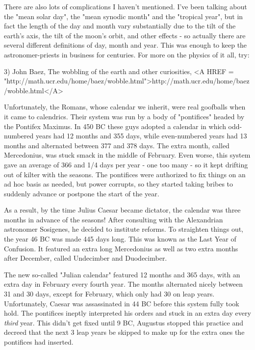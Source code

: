 There are also lots of complications I haven't mentioned.   I've been
talking about the "mean solar day", the "mean synodic month" and the
"tropical year", but in fact the length of the day and month vary
substantially due to the tilt of the earth's axis, the tilt of the
moon's orbit, and other effects - so actually there are several
different definitions of day, month and year.  This was enough to keep
the astronomer-priests in business for centuries.  For more on the
physics of it all, try:

3) John Baez, The wobbling of the earth and other curiosities,
<A HREF = "http://math.ucr.edu/home/baez/wobble.html">http://math.ucr.edu/home/baez/wobble.html</A>

Unfortunately, the Romans, whose calendar we inherit, were real
goofballs when it came to calendrics.  Their system was run by a body of
"pontifices" headed by the Pontifex Maximus.  In 450 BC these guys
adopted a calendar in which odd-numbered years had 12 months and 355
days, while even-numbered years had 13 months and alternated between 377
and 378 days.  The extra month, called Mercedonius, was stuck smack in
the middle of February.  Even worse, this system gave an average of 366
and 1/4 days per year - one too many - so it kept drifting out of kilter
with the seasons.  The pontifices were authorized to fix things on an ad
hoc basis as needed, but power corrupts, so they started taking bribes
to suddenly advance or postpone the start of the year.  

As a result, by the time Julius Caesar became dictator, the calendar was
three months in advance of the seasons!  After consulting with the
Alexandrian astronomer Sosigenes, he decided to institute reforms.  To
straighten things out, the year 46 BC was made 445 days long.   This 
was known as the Last Year of Confusion.  It featured an extra long
Mercedonius as well as two extra months after December, called Undecimber 
and Duodecimber.  

The new so-called "Julian calendar" featured 12 months and 365 days,
with an extra day in February every fourth year.  The months alternated
nicely between 31 and 30 days, except for February, which only had 30 on
leap years.  Unfortunately, Caesar was assassinated in 44 BC before this
system fully took hold.   The pontifices ineptly interpreted his orders
and stuck in an extra day every \emph{third} year.  This didn't get fixed
until 9 BC, Augustus stopped this practice and decreed that the next 3
leap years be skipped to make up for the extra ones the pontifices had
inserted.  

